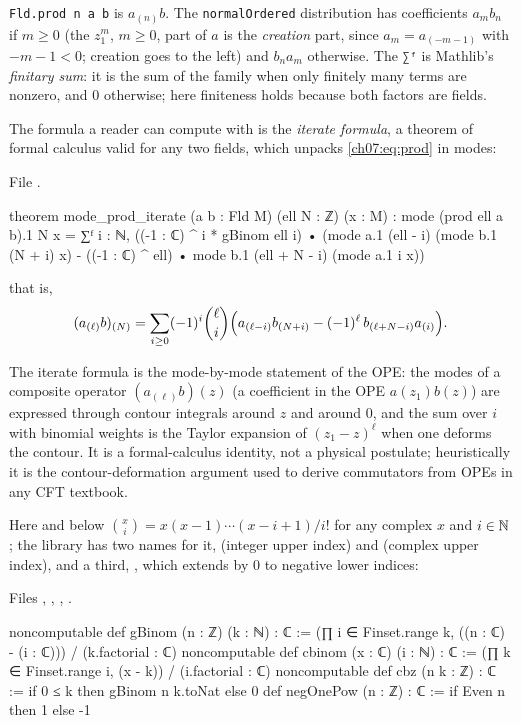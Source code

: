 \begin{dictionary}
\verb|Fld.prod n a b| is $a_{(n)}b$. The \verb|normalOrdered| distribution has coefficients
$a_m b_n$ if $m\ge 0$ (the $z_1^{m}$, $m\ge0$, part of $a$ is the \emph{creation} part, since
$a_m = a_{(-m-1)}$ with $-m-1<0$; creation goes to the left) and $b_n a_m$ otherwise. The
\verb|∑ᶠ| is Mathlib's \emph{finitary sum}: it is the sum of the family when only finitely many
terms are nonzero, and $0$ otherwise; here finiteness holds because both factors are fields.
\end{dictionary}

The formula a reader can compute with is the \emph{iterate formula}, a theorem of formal calculus
valid for any two fields, which unpacks \eqref{ch07:eq:prod} in modes:

\noindent File .
\begin{leancode}
theorem mode_prod_iterate (a b : Fld M) (ell N : ℤ) (x : M) :
    mode (prod ell a b).1 N x =
      ∑ᶠ i : ℕ, ((-1 : ℂ) ^ i * gBinom ell i) •
        (mode a.1 (ell - i) (mode b.1 (N + i) x)
          - ((-1 : ℂ) ^ ell) • mode b.1 (ell + N - i) (mode a.1 i x))
\end{leancode}

that is,
\begin{equation}\label{ch07:eq:iterate}
  (a_{(\ell)}b)_{(N)} = \sum_{i\ge0}(-1)^i\binom{\ell}{i}\Bigl(a_{(\ell-i)}b_{(N+i)} -
  (-1)^\ell\, b_{(\ell+N-i)}a_{(i)}\Bigr).
\end{equation}

\begin{physics}
The iterate formula is the mode-by-mode statement of the OPE: the modes of a composite operator $(a_{(\ell)}b)(z)$ (a coefficient in the OPE $a(z_1)b(z)$) are expressed through contour integrals around $z$ and around $0$, and the sum over $i$ with binomial weights is the Taylor expansion of $(z_1-z)^\ell$ when one deforms the contour. It is a formal-calculus identity, not a physical postulate; heuristically it is the contour-deformation argument used to derive commutators from OPEs in any CFT textbook.
\end{physics}
Here and below $\binom{x}{i} = x(x-1)\cdots(x-i+1)/i!$ for any complex $x$ and $i\in{\mathbb{N}}$; the
library has two names for it,  (integer upper index) and  (complex upper
index), and a third, , which extends  by $0$ to negative lower indices:

\noindent Files , , , .
\begin{leancode}
noncomputable def gBinom (n : ℤ) (k : ℕ) : ℂ :=
  (∏ i ∈ Finset.range k, ((n : ℂ) - (i : ℂ))) / (k.factorial : ℂ)
noncomputable def cbinom (x : ℂ) (i : ℕ) : ℂ :=
  (∏ k ∈ Finset.range i, (x - k)) / (i.factorial : ℂ)
noncomputable def cbz (n k : ℤ) : ℂ := if 0 ≤ k then gBinom n k.toNat else 0
def negOnePow (n : ℤ) : ℂ := if Even n then 1 else -1
\end{leancode}

